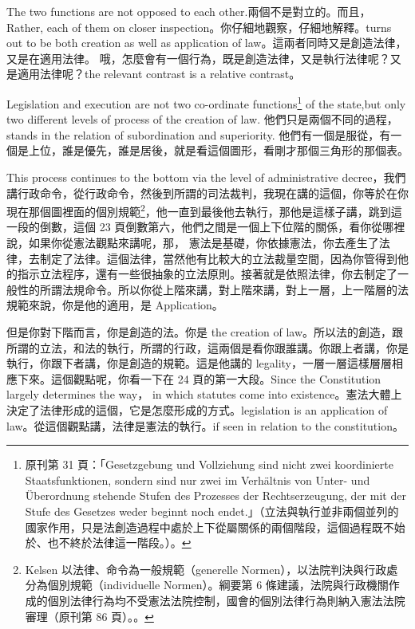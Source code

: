 \hypertarget{w05:cue:53}{}The two functions are not opposed to each other.兩個不是對立的。而且，
\hypertarget{w05:cue:54}{}Rather, each of them on closer inspection。你仔細地觀察，仔細地解釋。turns out to be both creation as well as application of law。這兩者同時又是創造法律，又是在適用法律。
\hypertarget{w05:cue:55}{}哦，怎麼會有一個行為，既是創造法律，又是執行法律呢？又是適用法律呢？the relevant contrast is a relative contrast。

\hypertarget{w05:cue:56}{}Legislation and execution are not two co-ordinate functions\footnote{原刊第 31 頁：「Gesetzgebung und Vollziehung sind nicht zwei koordinierte Staatsfunktionen, sondern sind nur zwei im Verhältnis von Unter- und Überordnung stehende Stufen des Prozesses der Rechtserzeugung, der mit der Stufe des Gesetzes weder beginnt noch endet.」（立法與執行並非兩個並列的國家作用，只是法創造過程中處於上下從屬關係的兩個階段，這個過程既不始於、也不終於法律這一階段。）\cite[31]{kelsen1929}。} of the state,but only two different levels of process of the creation of law.
\hypertarget{w05:cue:57}{}他們只是兩個不同的過程，stands in the relation of subordination and superiority.
\hypertarget{w05:cue:58}{}他們有一個是服從，有一個是上位，誰是優先，誰是居後，就是看這個圖形，看剛才那個三角形的那個表。

\hypertarget{w05:cue:59}{}This process continues to the bottom via the level of administrative decree，我們講行政命令，從行政命令，然後到所謂的司法裁判，我現在講的這個，你等於在你現在那個圖裡面的個別規範\footnote{Kelsen 以法律、命令為一般規範（generelle Normen），以法院判決與行政處分為個別規範（individuelle Normen）。綱要第 6 條建議，法院與行政機關作成的個別法律行為均不受憲法法院控制，國會的個別法律行為則納入憲法法院審理（原刊第 86 頁）。\cite[86]{kelsen1929}。}，他一直到最後他去執行，那他是這樣子講，跳到這一段的倒數，這個 23 頁倒數第六，他們之間是一個上下位階的關係，看你從哪裡說，如果你從憲法觀點來講呢，那，
\hypertarget{w05:cue:60}{}憲法是基礎，你依據憲法，你去產生了法律，去制定了法律。這個法律，當然他有比較大的立法裁量空間，因為你管得到他的指示立法程序，還有一些很抽象的立法原則。接著就是依照法律，你去制定了一般性的所謂法規命令。所以你從上階來講，對上階來講，對上一層，上一階層的法規範來說，你是他的適用，是 Application。

\hypertarget{w05:cue:61}{}但是你對下階而言，你是創造的法。你是 the creation of law。所以法的創造，跟所謂的立法，和法的執行，所謂的行政，這兩個是看你跟誰講。你跟上者講，你是執行，你跟下者講，你是創造的規範。這是他講的 legality，一層一層這樣層層相應下來。這個觀點呢，你看一下在 24 頁的第一大段。Since the Constitution largely determines the way，
\hypertarget{w05:cue:62}{}in which statutes come into existence。憲法大體上決定了法律形成的這個，它是怎麼形成的方式。legislation is an application of law。從這個觀點講，法律是憲法的執行。if seen in relation to the constitution。

